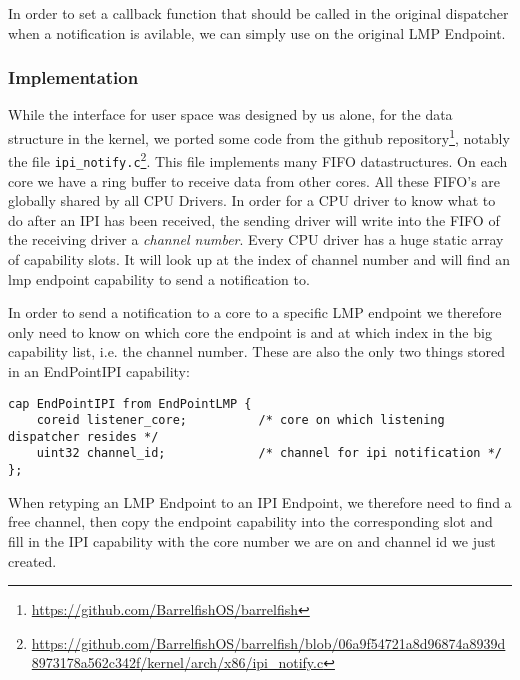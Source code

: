 In order to set a callback function that should be called in the original dispatcher
when a notification is avilable, we can simply use  on
the original LMP Endpoint.



\subsubsection{Implementation}
While the interface for user space was designed by us alone, for the
data structure in the kernel, we ported some code from the github
repository\footnote{\url{https://github.com/BarrelfishOS/barrelfish}},
notably the file \texttt{ipi\_notify.c}\footnote{\url{https://github.com/BarrelfishOS/barrelfish/blob/06a9f54721a8d96874a8939d8973178a562c342f/kernel/arch/x86/ipi_notify.c}}. This file implements many FIFO datastructures. On each core we have
a ring buffer to receive data from other cores. All these FIFO's are globally
shared by all CPU Drivers. In order for a CPU driver to know what to do
after an IPI has been received, the sending driver will write into the FIFO
of the receiving driver a \emph{channel number}. Every CPU driver has a huge
static array of capability slots. It will look up at the index of channel number
and will find an lmp endpoint capability to send a notification to.

In order to send a notification to a core to a specific LMP endpoint we
therefore only need to know on which core the endpoint is and at which
index in the big capability list, i.e. the channel number. These are also the
only two things stored in an EndPointIPI capability:
\begin{mdframed}[style=myframe]

\begin{verbatim}
cap EndPointIPI from EndPointLMP {
    coreid listener_core;          /* core on which listening dispatcher resides */
    uint32 channel_id;             /* channel for ipi notification */
};
\end{verbatim}
\end{mdframed}
When retyping an LMP Endpoint to an IPI Endpoint, we therefore need to find a free
channel, then copy the endpoint capability into the corresponding slot and fill in the
IPI capability with the core number we are on and channel id we just created.

